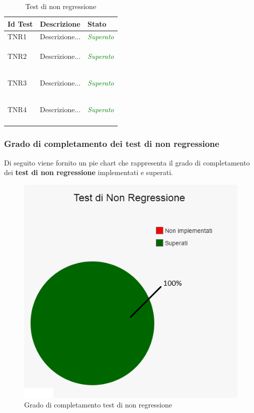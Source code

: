 	\normalsize
	\begin{longtable}{|>{\centering\arraybackslash}p{1.5cm}|>{\centering\arraybackslash}p{8cm} | >{\centering\arraybackslash}p{3.8cm}|}
		\hline \rowcolor{Gray}
		\textbf{Id Test} & \textbf{Descrizione} & \textbf{Stato}\\
		\hline
		\endhead
		\hypertarget{TNR1}{TNR1} & Descrizione... & \textcolor{Green}{\textit{Superato}}\\ \hline
		\hypertarget{TNR2}{TNR2} & Descrizione... & \textcolor{Green}{\textit{Superato}}\\ \hline
		\hypertarget{TNR3}{TNR3} & Descrizione... & \textcolor{Green}{\textit{Superato}}\\ \hline
		\hypertarget{TNR4}{TNR4} & Descrizione... & \textcolor{Green}{\textit{Superato}}\\ \hline
		\caption[Test di non regressione]{Test di non regressione}
		\label{tabella:test3}
	\end{longtable}
	
	\subsubsection{Grado di completamento dei test di non regressione}
	Di seguito viene fornito un pie chart che rappresenta il grado di completamento dei \textbf{test di non regressione} implementati e superati.
	\begin{figure}[H]
		\centering
		\includegraphics[scale=0.7]{includes/img/test_non_regressione.png}
		\caption{Grado di completamento test di non regressione}
	\end{figure}	
	
